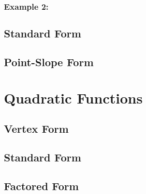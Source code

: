 \documentclass[11pt]{article}
\begin{document}
    \subsubsection{Example 2:}
  \subsection{Standard Form}
  \subsection{Point-Slope Form}
\section{Quadratic Functions}
  \subsection{Vertex Form}
  \subsection{Standard Form}
  \subsection{Factored Form}
\end{document}
